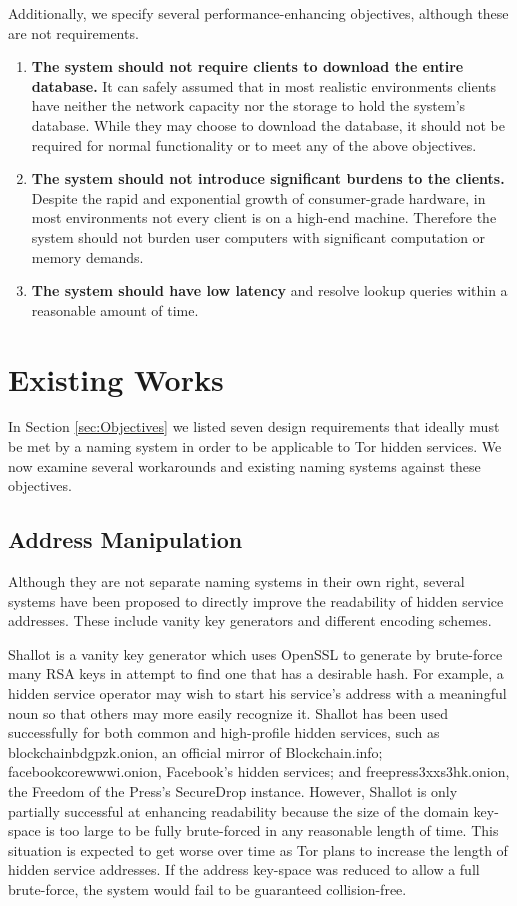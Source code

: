 \documentclass{sig-alternate}
\begin{document}
Additionally, we specify several performance-enhancing objectives, although these are not requirements.

\begin{enumerate}
	\item \textbf{The system should not require clients to download the entire database.} It can safely assumed that in most realistic environments clients have neither the network capacity nor the storage to hold the system's database. While they may choose to download the database, it should not be required for normal functionality or to meet any of the above objectives.
	\item \textbf{The system should not introduce significant burdens to the clients.} Despite the rapid and exponential growth of consumer-grade hardware, in most environments not every client is on a high-end machine. Therefore the system should not burden user computers with significant computation or memory demands.
	\item \textbf{The system should have low latency} and resolve lookup queries within a reasonable amount of time.
\end{enumerate}

\section{Existing Works}

In Section \ref{sec:Objectives} we listed seven design requirements that ideally must be met by a naming system in order to be applicable to Tor hidden services. We now examine several workarounds and existing naming systems against these objectives.

\subsection{Address Manipulation}

Although they are not separate naming systems in their own right, several systems have been proposed to directly improve the readability of hidden service addresses. These include vanity key generators and different encoding schemes.

Shallot is a vanity key generator which uses OpenSSL to generate by brute-force many RSA keys in attempt to find one that has a desirable hash.\cite{KatmagicShallot} For example, a hidden service operator may wish to start his service's address with a meaningful noun so that others may more easily recognize it. Shallot has been used successfully for both common and high-profile hidden services, such as blockchainbdgpzk.onion, an official mirror of Blockchain.info; facebookcorewwwi.onion, Facebook's hidden services; and  freepress3xxs3hk.onion, the Freedom of the Press's SecureDrop instance. However, Shallot is only partially successful at enhancing readability because the size of the domain key-space is too large to be fully brute-forced in any reasonable length of time.\cite{KatmagicShallot} This situation is expected to get worse over time as Tor plans to increase the length of hidden service addresses.\cite{Proposal224} If the address key-space was reduced to allow a full brute-force, the system would fail to be guaranteed collision-free.
\end{document}
